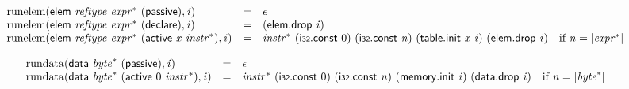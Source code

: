 \vspace{1ex}

$$
\begin{array}{@{}lcl@{}l@{}}
{\mathrm{runelem}}(\mathsf{elem}~{\mathit{reftype}}~{{\mathit{expr}}^\ast}~(\mathsf{passive}), {\mathit{i}}) &=& \epsilon &  \\
{\mathrm{runelem}}(\mathsf{elem}~{\mathit{reftype}}~{{\mathit{expr}}^\ast}~(\mathsf{declare}), {\mathit{i}}) &=& (\mathsf{elem.drop}~{\mathit{i}}) &  \\
{\mathrm{runelem}}(\mathsf{elem}~{\mathit{reftype}}~{{\mathit{expr}}^\ast}~(\mathsf{active}~{\mathit{x}}~{{\mathit{instr}}^\ast}), {\mathit{i}}) &=& {{\mathit{instr}}^\ast}~(\mathsf{i{\scriptstyle32}}.\mathsf{const}~0)~(\mathsf{i{\scriptstyle32}}.\mathsf{const}~{\mathit{n}})~(\mathsf{table.init}~{\mathit{x}}~{\mathit{i}})~(\mathsf{elem.drop}~{\mathit{i}}) &\quad
  \mbox{if}~{\mathit{n}} = {|{{\mathit{expr}}^\ast}|} \\
\end{array}
$$

$$
\begin{array}{@{}lcl@{}l@{}}
{\mathrm{rundata}}(\mathsf{data}~{{\mathit{byte}}^\ast}~(\mathsf{passive}), {\mathit{i}}) &=& \epsilon &  \\
{\mathrm{rundata}}(\mathsf{data}~{{\mathit{byte}}^\ast}~(\mathsf{active}~0~{{\mathit{instr}}^\ast}), {\mathit{i}}) &=& {{\mathit{instr}}^\ast}~(\mathsf{i{\scriptstyle32}}.\mathsf{const}~0)~(\mathsf{i{\scriptstyle32}}.\mathsf{const}~{\mathit{n}})~(\mathsf{memory.init}~{\mathit{i}})~(\mathsf{data.drop}~{\mathit{i}}) &\quad
  \mbox{if}~{\mathit{n}} = {|{{\mathit{byte}}^\ast}|} \\
\end{array}
$$

